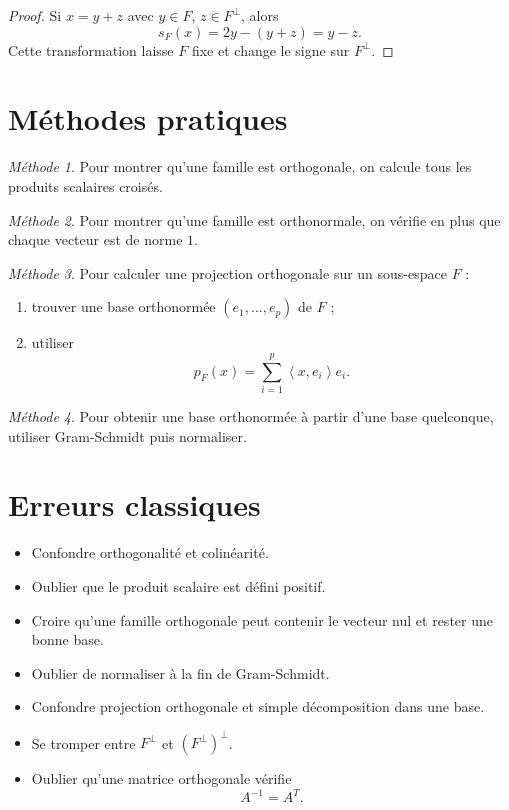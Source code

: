 \documentclass[11pt,a4paper]{article}
\theoremstyle{remark}
\newtheorem*{methode}{Méthode}
\newcommand{\scal}[2]{\left\langle #1,#2\right\rangle}
\newcommand{\Orth}{\perp}
\begin{document}
\begin{proof}
Si \(x=y+z\) avec \(y\in F\), \(z\in F^\Orth\), alors
\[
s_F(x)=2y-(y+z)=y-z.
\]
Cette transformation laisse \(F\) fixe et change le signe sur \(F^\Orth\).
\end{proof}

\section{Méthodes pratiques}

\begin{methode}
Pour montrer qu’une famille est orthogonale, on calcule tous les produits scalaires croisés.
\end{methode}

\begin{methode}
Pour montrer qu’une famille est orthonormale, on vérifie en plus que chaque vecteur est de norme \(1\).
\end{methode}

\begin{methode}
Pour calculer une projection orthogonale sur un sous-espace \(F\) :
\begin{enumerate}
    \item trouver une base orthonormée \((e_1,\dots,e_p)\) de \(F\) ;
    \item utiliser
    \[
    p_F(x)=\sum_{i=1}^p \scal{x}{e_i}e_i.
    \]
\end{enumerate}
\end{methode}

\begin{methode}
Pour obtenir une base orthonormée à partir d’une base quelconque, utiliser Gram-Schmidt puis normaliser.
\end{methode}

\section{Erreurs classiques}

\begin{itemize}
    \item Confondre orthogonalité et colinéarité.
    \item Oublier que le produit scalaire est défini positif.
    \item Croire qu’une famille orthogonale peut contenir le vecteur nul et rester une bonne base.
    \item Oublier de normaliser à la fin de Gram-Schmidt.
    \item Confondre projection orthogonale et simple décomposition dans une base.
    \item Se tromper entre \(F^\Orth\) et \((F^\Orth)^\Orth\).
    \item Oublier qu’une matrice orthogonale vérifie
    \[
    A^{-1}=A^T.
    \]
\end{itemize}
\end{document}
